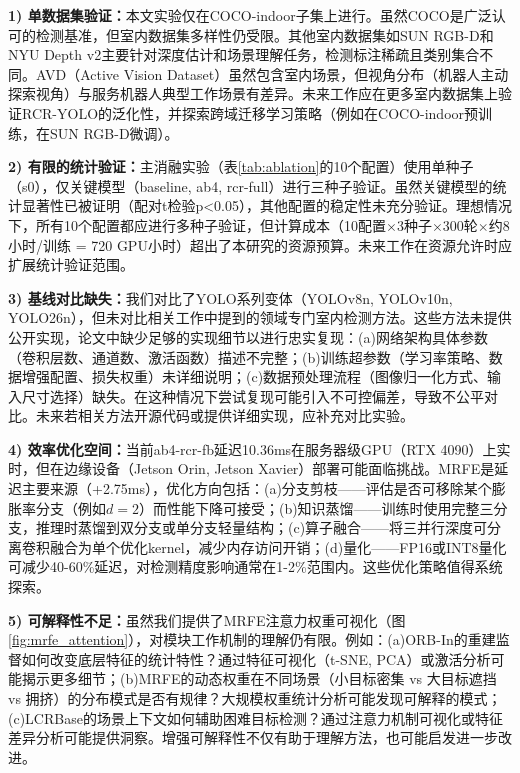 \documentclass[journal]{IEEEtran}
\begin{document}
\textbf{1) 单数据集验证：}本文实验仅在COCO-indoor子集上进行。虽然COCO是广泛认可的检测基准，但室内数据集多样性仍受限。其他室内数据集如SUN RGB-D\cite{song2015sun}和NYU Depth v2\cite{silberman2012nyu}主要针对深度估计和场景理解任务，检测标注稀疏且类别集合不同。AVD（Active Vision Dataset）\cite{ammirato2017avd}虽然包含室内场景，但视角分布（机器人主动探索视角）与服务机器人典型工作场景有差异。未来工作应在更多室内数据集上验证RCR-YOLO的泛化性，并探索跨域迁移学习策略（例如在COCO-indoor预训练，在SUN RGB-D微调）。

\textbf{2) 有限的统计验证：}主消融实验（表\ref{tab:ablation}的10个配置）使用单种子（s0），仅关键模型（baseline, ab4, rcr-full）进行三种子验证。虽然关键模型的统计显著性已被证明（配对t检验p<0.05），其他配置的稳定性未充分验证。理想情况下，所有10个配置都应进行多种子验证，但计算成本（10配置$\times$3种子$\times$300轮$\times$约8小时/训练 = 720 GPU小时）超出了本研究的资源预算。未来工作在资源允许时应扩展统计验证范围。

\textbf{3) 基线对比缺失：}我们对比了YOLO系列变体（YOLOv8n, YOLOv10n, YOLO26n），但未对比相关工作中提到的领域专门室内检测方法\cite{chen2020enhanced,zhang2021indoor}。这些方法未提供公开实现，论文中缺少足够的实现细节以进行忠实复现：(a)网络架构具体参数（卷积层数、通道数、激活函数）描述不完整；(b)训练超参数（学习率策略、数据增强配置、损失权重）未详细说明；(c)数据预处理流程（图像归一化方式、输入尺寸选择）缺失。在这种情况下尝试复现可能引入不可控偏差，导致不公平对比。未来若相关方法开源代码或提供详细实现，应补充对比实验。

\textbf{4) 效率优化空间：}当前ab4-rcr-fb延迟10.36ms在服务器级GPU（RTX 4090）上实时，但在边缘设备（Jetson Orin, Jetson Xavier）部署可能面临挑战。MRFE是延迟主要来源（+2.75ms），优化方向包括：(a)分支剪枝——评估是否可移除某个膨胀率分支（例如$d=2$）而性能下降可接受；(b)知识蒸馏——训练时使用完整三分支，推理时蒸馏到双分支或单分支轻量结构；(c)算子融合——将三并行深度可分离卷积融合为单个优化kernel，减少内存访问开销；(d)量化——FP16或INT8量化可减少40-60\%延迟，对检测精度影响通常在1-2\%范围内。这些优化策略值得系统探索。

\textbf{5) 可解释性不足：}虽然我们提供了MRFE注意力权重可视化（图\ref{fig:mrfe_attention}），对模块工作机制的理解仍有限。例如：(a)ORB-In的重建监督如何改变底层特征的统计特性？通过特征可视化（t-SNE, PCA）或激活分析可能揭示更多细节；(b)MRFE的动态权重在不同场景（小目标密集 vs 大目标遮挡 vs 拥挤）的分布模式是否有规律？大规模权重统计分析可能发现可解释的模式；(c)LCRBase的场景上下文如何辅助困难目标检测？通过注意力机制可视化或特征差异分析可能提供洞察。增强可解释性不仅有助于理解方法，也可能启发进一步改进。
\end{document}
